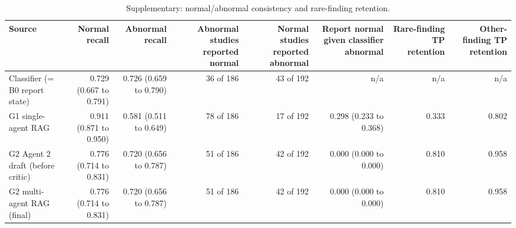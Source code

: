 \begin{table}[t]
\centering
\scriptsize
\begin{tabular}{lrrrrrrr}
\hline
Source & Normal recall & Abnormal recall & Abnormal studies reported normal & Normal studies reported abnormal & Report normal given classifier abnormal & Rare-finding TP retention & Other-finding TP retention \\
\hline
Classifier (= B0 report state) & 0.729 (0.667 to 0.791) & 0.726 (0.659 to 0.790) & 36 of 186 & 43 of 192 & n/a & n/a & n/a \\
G1 single-agent RAG & 0.911 (0.871 to 0.950) & 0.581 (0.511 to 0.649) & 78 of 186 & 17 of 192 & 0.298 (0.233 to 0.368) & 0.333 & 0.802 \\
G2 Agent 2 draft (before critic) & 0.776 (0.714 to 0.831) & 0.720 (0.656 to 0.787) & 51 of 186 & 42 of 192 & 0.000 (0.000 to 0.000) & 0.810 & 0.958 \\
G2 multi-agent RAG (final) & 0.776 (0.714 to 0.831) & 0.720 (0.656 to 0.787) & 51 of 186 & 42 of 192 & 0.000 (0.000 to 0.000) & 0.810 & 0.958 \\
\hline
\end{tabular}
\caption{Supplementary: normal/abnormal consistency and rare-finding retention.}
\label{tab:table8_supplementary_normal_abnormal_and_rare_findings}
\end{table}

